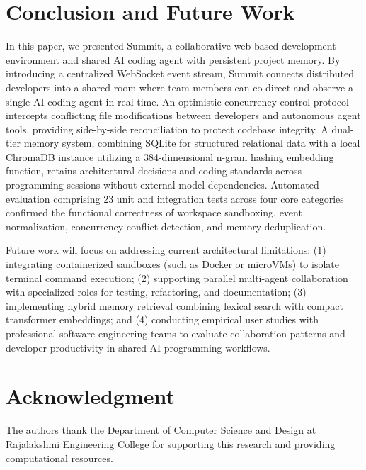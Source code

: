 \documentclass[conference]{IEEEtran}
\begin{document}
\section{Conclusion and Future Work}

In this paper, we presented Summit, a collaborative web-based development environment and shared AI coding agent with persistent project memory. By introducing a centralized WebSocket event stream, Summit connects distributed developers into a shared room where team members can co-direct and observe a single AI coding agent in real time. An optimistic concurrency control protocol intercepts conflicting file modifications between developers and autonomous agent tools, providing side-by-side reconciliation to protect codebase integrity. A dual-tier memory system, combining SQLite for structured relational data with a local ChromaDB instance utilizing a 384-dimensional n-gram hashing embedding function, retains architectural decisions and coding standards across programming sessions without external model dependencies. Automated evaluation comprising 23 unit and integration tests across four core categories confirmed the functional correctness of workspace sandboxing, event normalization, concurrency conflict detection, and memory deduplication.

Future work will focus on addressing current architectural limitations: (1) integrating containerized sandboxes (such as Docker or microVMs) to isolate terminal command execution; (2) supporting parallel multi-agent collaboration with specialized roles for testing, refactoring, and documentation; (3) implementing hybrid memory retrieval combining lexical search with compact transformer embeddings; and (4) conducting empirical user studies with professional software engineering teams to evaluate collaboration patterns and developer productivity in shared AI programming workflows.

\section*{Acknowledgment}
The authors thank the Department of Computer Science and Design at Rajalakshmi Engineering College for supporting this research and providing computational resources.



\end{document}
